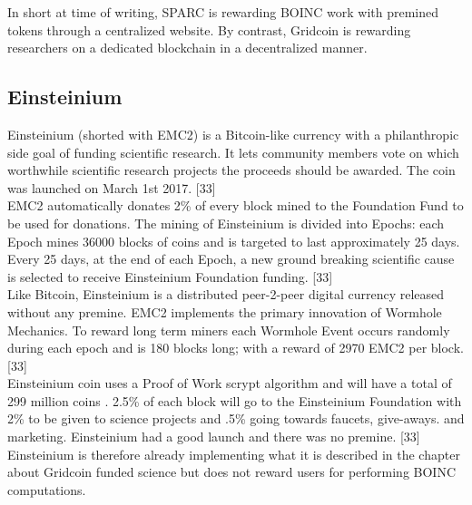 In short at time of writing, SPARC is rewarding BOINC work with premined tokens through a centralized website. By contrast, Gridcoin is rewarding researchers on a dedicated blockchain in a decentralized manner.\\


\subsection{Einsteinium}

Einsteinium (shorted with EMC2) is a Bitcoin-like currency with a philanthropic side goal of funding scientific research. It lets community members vote on which worthwhile scientific research projects the proceeds should be awarded. The coin was launched on March 1st 2017. [33]\\


EMC2 automatically donates 2\% of every block mined to the Foundation Fund to be used for donations. The mining of Einsteinium is divided into Epochs: each Epoch mines 36000 blocks of coins and is targeted to last approximately 25 days. Every 25 days, at the end of each Epoch, a new ground breaking scientific cause is selected to receive Einsteinium Foundation funding. [33]\\

Like Bitcoin, Einsteinium is a distributed peer-2-peer digital currency released without any premine. EMC2 implements the primary innovation of Wormhole Mechanics. To reward long term miners each Wormhole Event occurs randomly during each epoch and is 180 blocks long; with a reward of 2970 EMC2 per block. [33]\\


Einsteinium coin uses a Proof of Work scrypt algorithm and will have a total of 299 million coins . 2.5\% of each block will go to the Einsteinium Foundation with 2\% to be given to science projects and .5\% going towards faucets, give-aways. and marketing. Einsteinium had a good launch and there was no premine. [33]\\
 
Einsteinium is therefore already implementing what it is described in the chapter about Gridcoin funded science but does not reward users for performing BOINC computations.
